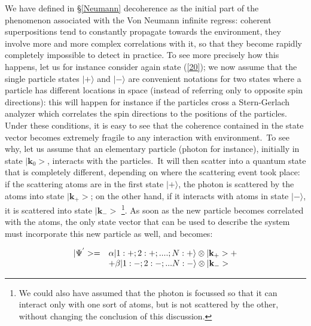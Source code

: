 \documentclass[12pt,onecolumn]{article}%
\begin{document}
We have defined in \S \ref{Neumann} decoherence as the initial part of the
phenomenon associated with the Von Neumann infinite regress: coherent
superpositions tend to constantly propagate towards the environment, they
involve more and more complex correlations with it, so that they become
rapidly completely impossible to detect in practice. To see more precisely how
this happens, let us for instance consider again state (\ref{20}); we now
assume that the single particle states $|+\rangle $ and $|-\rangle $ are convenient
notations for two states where a particle has different locations in space
(instead of referring only to opposite spin directions): this will happen for
instance if the particles cross a Stern-Gerlach analyzer which correlates the
spin directions to the positions of the particles. Under these conditions, it
is easy to see that the coherence contained in the state vector becomes
extremely fragile to any interaction with environment.\ To see why, let us
assume that an elementary particle (photon for instance), initially in state
$|\mathbf{k}_{0}>$, interacts with the particles.\ It will then scatter
into a quantum state that is completely different, depending on where the
scattering event took place: if the scattering atoms are in the first state
$|+\rangle $, the photon is scattered by the atoms into state $|\mathbf{k}%
_{+}>$; on the other hand, if it interacts with atoms in state $|-\rangle $, it is
scattered into state $|\mathbf{k}_{-}>$ \footnote{We could also have
assumed that the photon is focussed so that it can interact only with one sort
of atoms, but is not scattered by the other, without changing the conclusion
of this discussion.}. As soon as the new particle becomes correlated with the
atoms, the only state vector that can be used to describe the system must
incorporate this new particle as well, and becomes:%

\begin{equation}%
\begin{array}
[c]{cl}%
|\Psi^{^{\prime}}>= & \alpha|1:+;2:+;....;N:+\rangle \otimes|\mathbf{k}%
_{+}>+\\
& +\beta|1:-;2:-;...N:-\rangle \otimes|\mathbf{k}_{-}>
\end{array}
\label{23}%
\end{equation}
\end{document}
